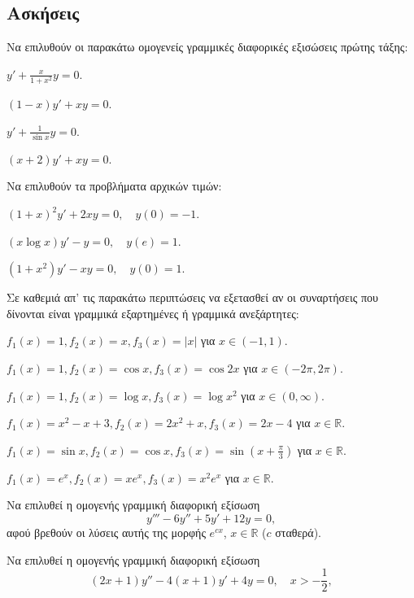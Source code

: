 \documentclass[11pt,a4paper,twoside]{book}
\begin{document}
\subsection{Ασκήσεις}
\begin{askhseis}
\item Να επιλυθούν οι παρακάτω ομογενείς γραμμικές διαφορικές εξισώσεις πρώτης τάξης:
    \begin{rlist}
        \item $y' + \frac{x}{1+x^2}y=0$.
        \item $(1-x)y' + xy = 0$.
        \item $y' + \frac{1}{\sin x}y=0$.
        \item $(x+2)y'+xy=0$.
    \end{rlist}
\item Να επιλυθούν τα προβλήματα αρχικών τιμών:
    \begin{rlist}
        \item $(1+x)^2 y' + 2xy = 0, \quad y(0)=-1$.
        \item $(x\log x)y' - y = 0, \quad y(e)=1$.
        \item $(1+x^2)y' - xy=0, \quad y(0)=1$.
    \end{rlist}
\item Σε καθεμιά απ' τις παρακάτω περιπτώσεις να εξετασθεί αν οι συναρτήσεις που δίνονται είναι γραμμικά εξαρτημένες ή γραμμικά ανεξάρτητες:
    \begin{rlist}
        \item $f_1(x)=1, f_2(x)=x, f_3(x)=|x|$ για $x\in(-1,1)$.
        \item $f_1(x)=1, f_2(x)=\cos x, f_3(x)=\cos 2x$ για $x\in(-2\pi, 2\pi)$.
    \item $f_1(x)=1, f_2(x)=\log x, f_3(x)=\log x^2$ για $x\in(0, \infty)$.
    \item $f_1(x)=x^2-x+3, f_2(x)=2x^2+x, f_3(x)=2x-4$ για $x\in\mathbb{R}$.
    \item $f_1(x)=\sin x, f_2(x)=\cos x, f_3(x)=\sin(x+\frac{\pi}{3})$ για $x\in\mathbb{R}$.
    \item $f_1(x)=e^x, f_2(x)=xe^x, f_3(x)=x^2 e^x$ για $x\in\mathbb{R}$.
\end{rlist}
\item Να επιλυθεί η ομογενής γραμμική διαφορική εξίσωση
\[
    y''' - 6y'' + 5y' + 12y = 0,
\]
αφού βρεθούν οι λύσεις αυτής της μορφής $e^{cx}$, $x\in\mathbb{R}$ ($c$ σταθερά).
\item Να επιλυθεί η ομογενής γραμμική διαφορική εξίσωση
\[
    (2x+1)y'' - 4(x+1)y' + 4y = 0, \quad x>-\frac{1}{2},
\]
\end{askhseis}
\end{document}
